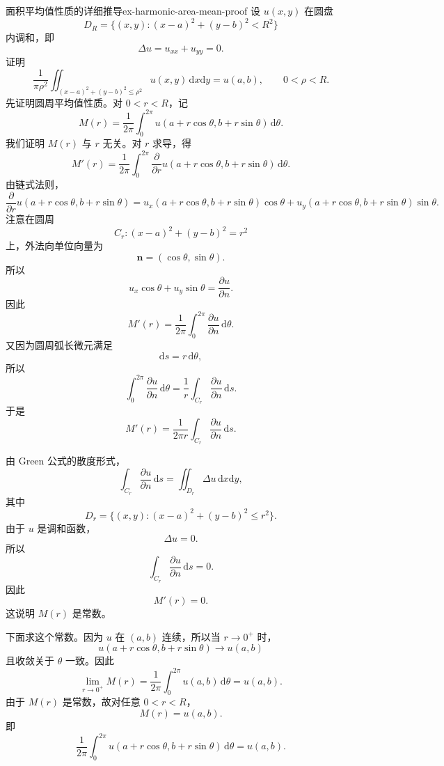 \documentclass[UTF8,zihao=-4,openany]{ctexbook}
\begin{document}
\begin{example}{面积平均值性质的详细推导}{ex-harmonic-area-mean-proof}
设 $u(x,y)$ 在圆盘
\[
  D_R=\{(x,y):(x-a)^2+(y-b)^2<R^2\}
\]
内调和，即
\[
  \Delta u=u_{xx}+u_{yy}=0.
\]
证明
\[
  \frac{1}{\pi\rho^2}
  \iint_{(x-a)^2+(y-b)^2\leq \rho^2}u(x,y)\,\mathrm{d}x\mathrm{d}y
  =
  u(a,b),
  \qquad 0<\rho<R.
\]
\tcblower
先证明圆周平均值性质。对 $0<r<R$，记
\[
  M(r)=\frac{1}{2\pi}\int_0^{2\pi}
  u(a+r\cos\theta,b+r\sin\theta)\,\mathrm{d}\theta.
\]
我们证明 $M(r)$ 与 $r$ 无关。对 $r$ 求导，得
\[
  M'(r)
  =
  \frac{1}{2\pi}\int_0^{2\pi}
  \frac{\partial}{\partial r}
  u(a+r\cos\theta,b+r\sin\theta)\,\mathrm{d}\theta.
\]
由链式法则，
\[
  \frac{\partial}{\partial r}
  u(a+r\cos\theta,b+r\sin\theta)
  =
  u_x(a+r\cos\theta,b+r\sin\theta)\cos\theta
  +
  u_y(a+r\cos\theta,b+r\sin\theta)\sin\theta.
\]
注意在圆周
\[
  C_r:(x-a)^2+(y-b)^2=r^2
\]
上，外法向单位向量为
\[
  \mathbf n=(\cos\theta,\sin\theta).
\]
所以
\[
  u_x\cos\theta+u_y\sin\theta
  =
  \frac{\partial u}{\partial n}.
\]
因此
\[
  M'(r)
  =
  \frac{1}{2\pi}\int_0^{2\pi}
  \frac{\partial u}{\partial n}\,\mathrm{d}\theta.
\]
又因为圆周弧长微元满足
\[
  \mathrm{d}s=r\,\mathrm{d}\theta,
\]
所以
\[
  \int_0^{2\pi}\frac{\partial u}{\partial n}\,\mathrm{d}\theta
  =
  \frac{1}{r}\int_{C_r}\frac{\partial u}{\partial n}\,\mathrm{d}s.
\]
于是
\[
  M'(r)
  =
  \frac{1}{2\pi r}\int_{C_r}\frac{\partial u}{\partial n}\,\mathrm{d}s.
\]

由 Green 公式的散度形式，
\[
  \int_{C_r}\frac{\partial u}{\partial n}\,\mathrm{d}s
  =
  \iint_{D_r}\Delta u\,\mathrm{d}x\mathrm{d}y,
\]
其中
\[
  D_r=\{(x,y):(x-a)^2+(y-b)^2\leq r^2\}.
\]
由于 $u$ 是调和函数，
\[
  \Delta u=0.
\]
所以
\[
  \int_{C_r}\frac{\partial u}{\partial n}\,\mathrm{d}s=0.
\]
因此
\[
  M'(r)=0.
\]
这说明 $M(r)$ 是常数。

下面求这个常数。因为 $u$ 在 $(a,b)$ 连续，所以当 $r\to0^+$ 时，
\[
  u(a+r\cos\theta,b+r\sin\theta)\to u(a,b)
\]
且收敛关于 $\theta$ 一致。因此
\[
  \lim_{r\to0^+}M(r)
  =
  \frac{1}{2\pi}\int_0^{2\pi}u(a,b)\,\mathrm{d}\theta
  =
  u(a,b).
\]
由于 $M(r)$ 是常数，故对任意 $0<r<R$，
\[
  M(r)=u(a,b).
\]
即
\[
  \frac{1}{2\pi}\int_0^{2\pi}
  u(a+r\cos\theta,b+r\sin\theta)\,\mathrm{d}\theta
  =
  u(a,b).
\]


\end{example}
\end{document}
